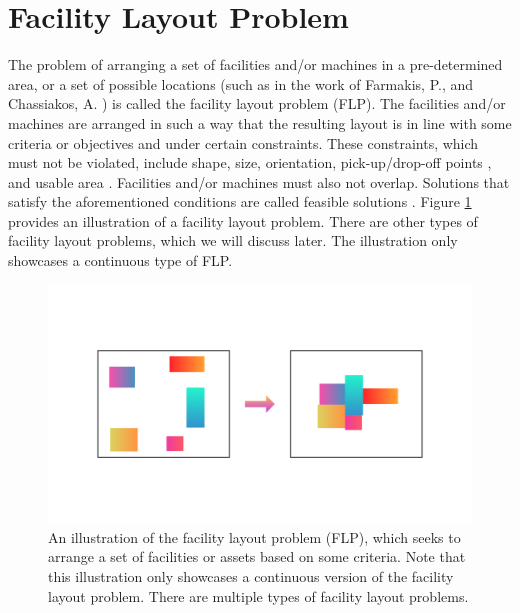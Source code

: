 \section{Facility Layout Problem}
The problem of arranging a set of facilities and/or machines in a pre-determined area, or a set of possible locations (such as in the work of Farmakis, P., and Chassiakos, A. \cite{Farmakis2018}) is called the facility layout problem (FLP). The facilities and/or machines are arranged in such a way that the resulting layout is in line with some criteria or objectives and under certain constraints. These constraints, which must not be violated, include shape, size, orientation, pick-up/drop-off points \cite{Hosseini-Nasab2018}, and usable area \cite{Fernando2015}. Facilities and/or machines must also not overlap. Solutions that satisfy the aforementioned conditions are called feasible solutions \cite{Meller1996}. Figure \ref{flp-illustration} provides an illustration of a facility layout problem. There are other types of facility layout problems, which we will discuss later. The illustration only showcases a continuous type of FLP.

\begin{figure}[h!]
	\centering
	\includegraphics[scale=0.25]{./images/chap01-introduction/flp-illustration.png}
	\caption{An illustration of the facility layout problem (FLP), which seeks to arrange a set of facilities or assets based on some criteria. Note that this illustration only showcases a continuous version of the facility layout problem. There are multiple types of facility layout problems.}
	\label{flp-illustration}
\end{figure}



